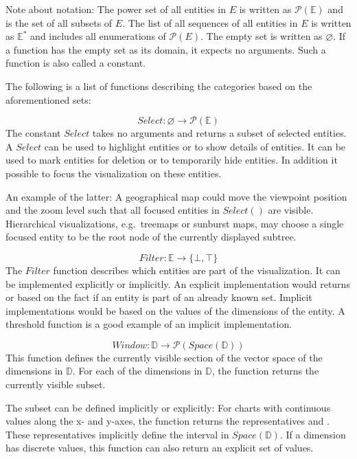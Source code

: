Note about notation:
The power set of all entities in $E$ is written as $ \mathcal{P}(\mathbb{E})$ and is the set of all subsets of $E$.
The list of all sequences of all entities in $E$ is written as $ \mathbb{E^*} $ and includes all enumerations of $\mathcal{P}(E)$.
The empty set is written as $\varnothing$.
If a function has the empty set as its domain, it expects no arguments.
Such a function is also called a constant.

The following is a list of functions describing the categories based on the aforementioned sets:

\begin{equation} Select: \varnothing \rightarrow \mathcal{P}(\mathbb{E}) \end{equation}
  The constant $Select$ takes no arguments and returns a subset of selected entities.
  A $Select$ can be used to highlight entities or to show details of entities.
  It can be used to mark entities for deletion or to temporarily hide entities.
  In addition it possible to focus the visualization on these entities.

  An example of the latter:
  A geographical map could move the viewpoint position and the zoom level such that all focused entities in $Select()$ are visible.
  Hierarchical visualizations, e.g.\ treemaps or sunburst maps, may choose a single focused entity to be the root node of the currently displayed subtree.

\begin{equation} Filter: \mathbb{E} \rightarrow \{ \bot, \top \} \end{equation}
  The $Filter$ function describes which entities are part of the visualization.
  It can be implemented explicitly or implicitly.
  An explicit implementation would returns  or  based on the fact if an entity is part of an already known set.
  Implicit implementations would be based on the values of the dimensions of the entity.
  A threshold function is a good example of an implicit implementation.

\begin{equation} Window: \mathbb{D} \rightarrow \mathcal{P}(Space(\mathbb{D})) \end{equation}
  This function defines the currently visible section of the vector space of the dimensions in $\mathbb{D}$.
  For each of the dimensions in $\mathbb{D}$, the function returns the currently visible subset.

  The subset can be defined implicitly or explicitly:
  For charts with continuous values along the x- and y-axes, the function returns the representatives  and .
  These representatives implicitly define the interval in $Space(\mathbb{D})$.
  If a dimension has discrete values, this function can also return an explicit set of values.


